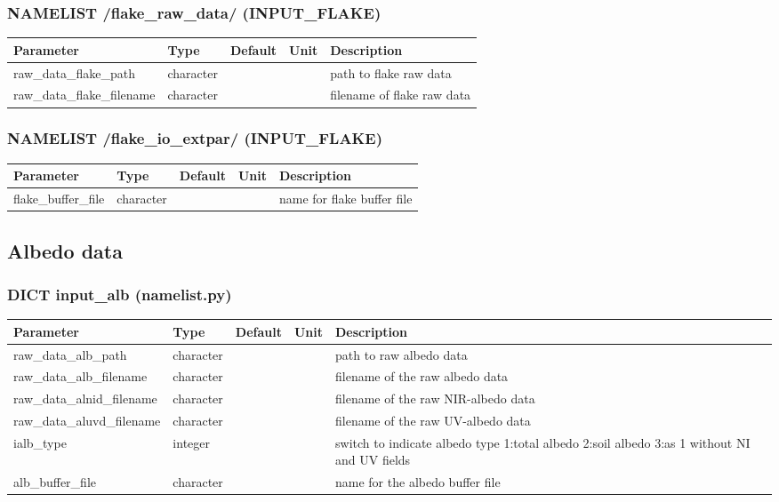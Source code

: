 \documentclass[a4paper,10pt,DIV14,BCOR1cm,titlepage,twoside]{scrartcl}
\providecommand{\tabularnewline}{\\}
\begin{document}
\subsubsection*{NAMELIST /flake\_raw\_data/ (INPUT\_FLAKE)}

\begin{longtable}{|p{4cm}|p{1.5cm}|p{1.5cm}|p{1cm}|p{6cm}|}
\hline 
\textbf{Parameter}& \textbf{Type}& \textbf{Default}& \textbf{Unit}& \textbf{Description}
\tabularnewline
\hline
\endhead
\hline 
raw\_data\_flake\_path & character & &  & path to flake raw data \tabularnewline
\hline 
raw\_data\_flake\_filename & character & &  & filename of flake raw data \tabularnewline
\hline
\bottomrule
\end{longtable}

\subsubsection*{NAMELIST /flake\_io\_extpar/ (INPUT\_FLAKE)}
\begin{longtable}{|p{4cm}|p{1.5cm}|p{1.5cm}|p{1cm}|p{6cm}|}
\hline 
\textbf{Parameter}& \textbf{Type}& \textbf{Default}& \textbf{Unit}& \textbf{Description}
\tabularnewline
\hline
\endhead
\hline
flake\_buffer\_file & character & &  & name for flake buffer file
\tabularnewline
\bottomrule
\end{longtable}

\subsection{Albedo data}\label{namelist_input_for_extpar_albedo}

\subsubsection*{DICT input\_alb (namelist.py)}

\begin{longtable}{|p{4cm}|p{1.5cm}|p{1.5cm}|p{1cm}|p{6cm}|}
\hline 
\textbf{Parameter}& \textbf{Type}& \textbf{Default}& \textbf{Unit}& \textbf{Description}
\tabularnewline
\hline
\endhead
\hline 
raw\_data\_alb\_path & character & & & path to raw albedo data
\tabularnewline
\hline
raw\_data\_alb\_filename & character & & & filename of the raw albedo data
\tabularnewline
\hline
raw\_data\_alnid\_filename & character & & & filename of the raw NIR-albedo data
\tabularnewline
\hline
raw\_data\_aluvd\_filename & character & & & filename of the raw UV-albedo data
\tabularnewline
\hline
ialb\_type & integer &  & & switch to indicate albedo type 1:total albedo 2:soil albedo 3:as 1 without NI and UV fields
\tabularnewline
\hline
alb\_buffer\_file & character & & & name for the albedo buffer file
\tabularnewline
\bottomrule
\end{longtable}
\end{document}

